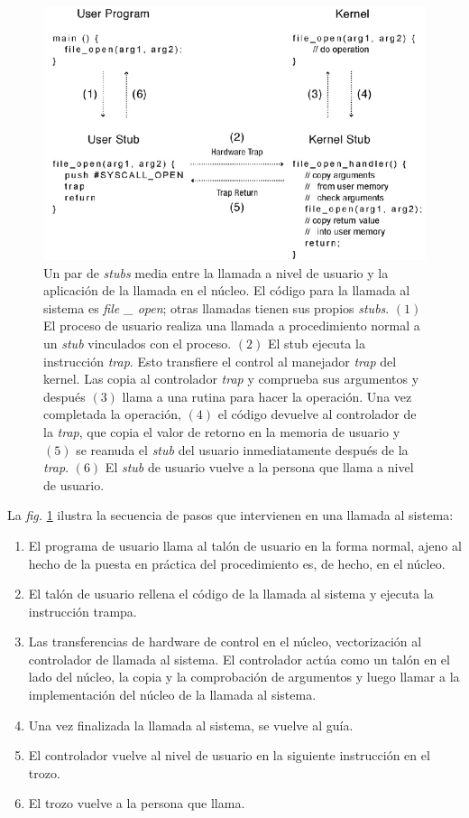 \documentclass[10pt]{book}
\begin{document}
\begin{figure}[tbhp]
\centerline{\includegraphics[scale=0.45]{img/fig10}}
\caption{Un par de \textit{stubs} media entre la llamada a nivel de usuario y la aplicación de la llamada en el núcleo. El código para la llamada al sistema es \textit{file \_ open}; otras llamadas tienen sus propios \textit{stubs}. $(1)$ El proceso de usuario realiza una llamada a procedimiento normal a un \textit{stub} vinculados con el proceso. $(2)$ El stub ejecuta la instrucción \textit{trap}. Esto transfiere el control al manejador \textit{trap} del kernel. Las copia al controlador \textit{trap} y comprueba sus argumentos y después $(3)$ llama a una rutina para hacer la operación. Una vez completada la operación, $(4)$ el código devuelve al controlador de la \textit{trap}, que copia el valor de retorno en la memoria de usuario y $(5)$ se reanuda el \textit{stub} del usuario inmediatamente después de la \textit{trap}. $(6)$ El \textit{stub} de usuario vuelve a la persona que llama a nivel de usuario.}
\label{fig10}
\end{figure}

La \textit{fig.} \ref{fig10} ilustra la secuencia de pasos que intervienen en una llamada al sistema:
\begin{enumerate}
\item El programa de usuario llama al talón de usuario en la forma normal, ajeno al hecho de la puesta en práctica del procedimiento es, de hecho, en el núcleo.
\item El talón de usuario rellena el código de la llamada al sistema y ejecuta la instrucción trampa.
\item Las transferencias de hardware de control en el núcleo, vectorización al controlador de llamada al sistema. El controlador actúa como un talón en el lado del núcleo, la copia y la comprobación de argumentos y luego llamar a la implementación del núcleo de la llamada al sistema.
\item Una vez finalizada la llamada al sistema, se vuelve al guía.
\item El controlador vuelve al nivel de usuario en la siguiente instrucción en el trozo.
\item El trozo vuelve a la persona que llama.
\end{enumerate}
\end{document}

